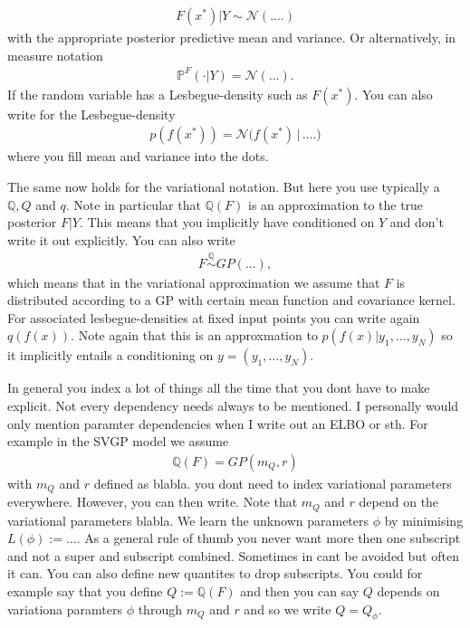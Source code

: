 \documentclass{article}
\numberwithin{equation}{section}
\begin{document}
\begin{align}
    F(x^*) | Y \sim \mathcal{N}(....)
\end{align}
with the appropriate posterior predictive mean and variance. Or alternatively, in measure notation
\begin{align}
    \mathbb{P}^F( \cdot| Y) = \mathcal{N}(...). 
\end{align}
If the random variable has a Lesbegue-density such as $F(x^*)$. You can also write for the Lesbegue-density
\begin{align}
    p( f(x^*) ) = \mathcal{N} \big( f(x^*) \, | \, ....)
\end{align}
where you fill mean and variance into the dots. 

The same now holds for the variational notation. But here you use typically a $\mathbb{Q},Q$ and $q$. Note in particular that $\mathbb{Q}(F)$ is an approximation to the true posterior $F | Y$. This means that you implicitly have conditioned on $Y$ and don't write it out explicitly. You can also write 
\begin{align}
    F \overset{\mathbb{Q}}{\sim} GP(...),
\end{align}
which means that in the variational approximation we assume that $F$ is distributed according to a GP with certain mean function and covariance kernel. For associated lesbegue-densities at fixed input points you can write again $q(f(x))$. Note again that this is an approxmation to $p(f(x)|y_1, \hdots, y_N)$ so it implicitly entails a conditioning on $y=(y_1, \hdots, y_N)$.

In general you index a lot of things all the time that you dont have to make explicit. Not every dependency needs always to be mentioned. I personally would only mention paramter dependencies when I write out an ELBO or sth. For example in the SVGP model we assume 
\begin{align}
    \mathbb{Q}(F) = GP( m_Q, r)
\end{align}
with $m_Q$ and $r$ defined as blabla. you dont need to index variational parameters everywhere. However, you can then write. Note that $m_Q$ and $r$ depend on the variational parameters blabla. We learn the unknown parameters $\phi$ by minimising $L(\phi) := ...$. As a general rule of thumb you never want more then one subscript and not a super and subscript combined. Sometimes in cant be avoided but often it can. You can also define new quantites to drop subscripts. You could for example say that you define $Q := \mathbb{Q}(F)$ and then you can say $Q$ depends on variationa paramters $\phi$ through $m_Q$ and $r$ and so we write $Q = Q_\phi$.
\end{document}
